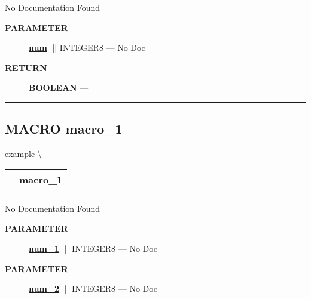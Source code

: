 \par





No Documentation Found






\par
\begin{description}
\item [\colorbox{tagtype}{\color{white} \textbf{\textsf{PARAMETER}}}] \textbf{\underline{num}} ||| INTEGER8 --- No Doc
\end{description}







\par
\begin{description}
\item [\colorbox{tagtype}{\color{white} \textbf{\textsf{RETURN}}}] \textbf{BOOLEAN} --- 
\end{description}




\rule{\linewidth}{0.5pt}
\subsection*{\textsf{\colorbox{headtoc}{\color{white} MACRO}
macro\_1}}

\hypertarget{ecldoc:example.macro_1}{}
\hspace{0pt} \hyperlink{ecldoc:example}{example} \textbackslash 

{\renewcommand{\arraystretch}{1.5}
\begin{tabularx}{\textwidth}{|>{\raggedright\arraybackslash}l|X|}
\hline
\hspace{0pt}\mytexttt{\color{red} } & \textbf{macro\_1} \\
\hline
\multicolumn{2}{|>{\raggedright\arraybackslash}X|}{\hspace{0pt}\mytexttt{\color{param} (num\_1, num\_2)}} \\
\hline
\end{tabularx}
}

\par





No Documentation Found






\par
\begin{description}
\item [\colorbox{tagtype}{\color{white} \textbf{\textsf{PARAMETER}}}] \textbf{\underline{num\_1}} ||| INTEGER8 --- No Doc
\item [\colorbox{tagtype}{\color{white} \textbf{\textsf{PARAMETER}}}] \textbf{\underline{num\_2}} ||| INTEGER8 --- No Doc
\end{description}







